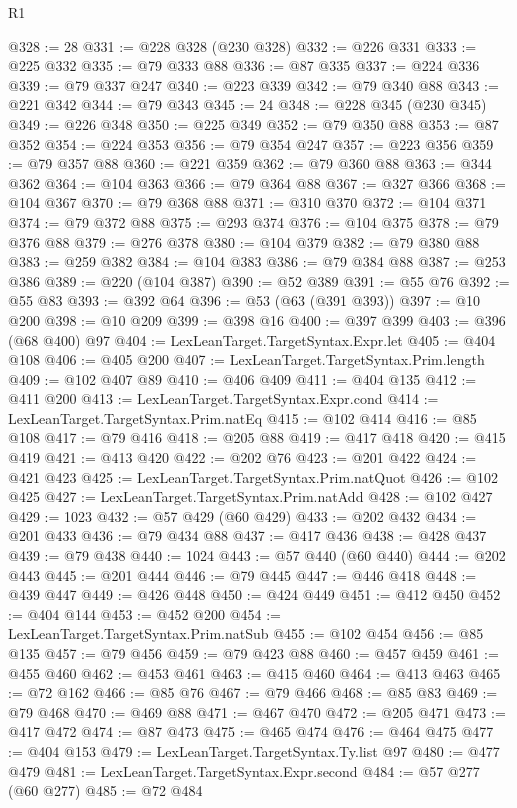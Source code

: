 \begin{lexlean}{R1}
\begin{coremodule}
@328 := 28
@331 := @228 @328 (@230 @328)
@332 := @226 @331
@333 := @225 @332
@335 := @79 @333 @88
@336 := @87 @335
@337 := @224 @336
@339 := @79 @337 @247
@340 := @223 @339
@342 := @79 @340 @88
@343 := @221 @342
@344 := @79 @343
@345 := 24
@348 := @228 @345 (@230 @345)
@349 := @226 @348
@350 := @225 @349
@352 := @79 @350 @88
@353 := @87 @352
@354 := @224 @353
@356 := @79 @354 @247
@357 := @223 @356
@359 := @79 @357 @88
@360 := @221 @359
@362 := @79 @360 @88
@363 := @344 @362
@364 := @104 @363
@366 := @79 @364 @88
@367 := @327 @366
@368 := @104 @367
@370 := @79 @368 @88
@371 := @310 @370
@372 := @104 @371
@374 := @79 @372 @88
@375 := @293 @374
@376 := @104 @375
@378 := @79 @376 @88
@379 := @276 @378
@380 := @104 @379
@382 := @79 @380 @88
@383 := @259 @382
@384 := @104 @383
@386 := @79 @384 @88
@387 := @253 @386
@389 := @220 (@104 @387)
@390 := @52 @389
@391 := @55 @76
@392 := @55 @83
@393 := @392 @64
@396 := @53 (@63 (@391 @393))
@397 := @10 @200
@398 := @10 @209
@399 := @398 @16
@400 := @397 @399
@403 := @396 (@68 @400) @97
@404 := LexLeanTarget.TargetSyntax.Expr.let
@405 := @404 @108
@406 := @405 @200
@407 := LexLeanTarget.TargetSyntax.Prim.length
@409 := @102 @407 @89
@410 := @406 @409
@411 := @404 @135
@412 := @411 @200
@413 := LexLeanTarget.TargetSyntax.Expr.cond
@414 := LexLeanTarget.TargetSyntax.Prim.natEq
@415 := @102 @414
@416 := @85 @108
@417 := @79 @416
@418 := @205 @88
@419 := @417 @418
@420 := @415 @419
@421 := @413 @420
@422 := @202 @76
@423 := @201 @422
@424 := @421 @423
@425 := LexLeanTarget.TargetSyntax.Prim.natQuot
@426 := @102 @425
@427 := LexLeanTarget.TargetSyntax.Prim.natAdd
@428 := @102 @427
@429 := 1023
@432 := @57 @429 (@60 @429)
@433 := @202 @432
@434 := @201 @433
@436 := @79 @434 @88
@437 := @417 @436
@438 := @428 @437
@439 := @79 @438
@440 := 1024
@443 := @57 @440 (@60 @440)
@444 := @202 @443
@445 := @201 @444
@446 := @79 @445
@447 := @446 @418
@448 := @439 @447
@449 := @426 @448
@450 := @424 @449
@451 := @412 @450
@452 := @404 @144
@453 := @452 @200
@454 := LexLeanTarget.TargetSyntax.Prim.natSub
@455 := @102 @454
@456 := @85 @135
@457 := @79 @456
@459 := @79 @423 @88
@460 := @457 @459
@461 := @455 @460
@462 := @453 @461
@463 := @415 @460
@464 := @413 @463
@465 := @72 @162
@466 := @85 @76
@467 := @79 @466
@468 := @85 @83
@469 := @79 @468
@470 := @469 @88
@471 := @467 @470
@472 := @205 @471
@473 := @417 @472
@474 := @87 @473
@475 := @465 @474
@476 := @464 @475
@477 := @404 @153
@479 := LexLeanTarget.TargetSyntax.Ty.list @97
@480 := @477 @479
@481 := LexLeanTarget.TargetSyntax.Expr.second
@484 := @57 @277 (@60 @277)
@485 := @72 @484

\end{coremodule}
\end{lexlean}
